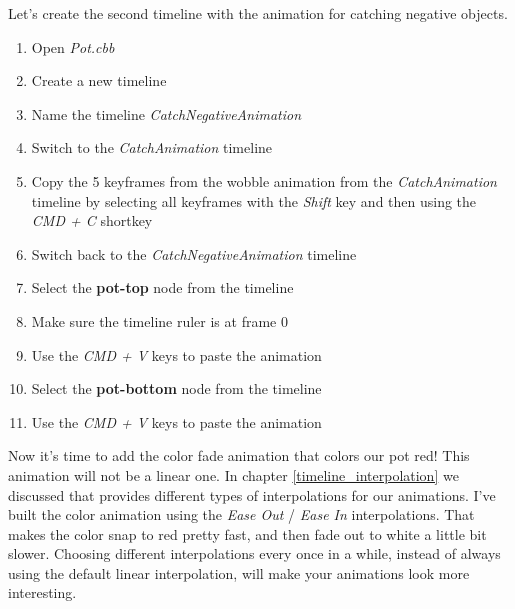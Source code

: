 \begin{leftbar}
Let's create the second timeline with the animation for catching negative
objects.
\begin{enumerate}
  \item Open \textit{Pot.cbb}
  \item Create a new timeline
  \item Name the timeline \textit{CatchNegativeAnimation}
  \item Switch to the \textit{CatchAnimation} timeline
  \item Copy the 5 keyframes from the wobble animation from the
  \textit{CatchAnimation} timeline by selecting all keyframes with the
  \textit{Shift} key and then using the \textit{CMD + C} shortkey
  \item Switch back to the \textit{CatchNegativeAnimation} timeline
  \item Select the \textbf{pot-top} node from the timeline
  \item Make sure the timeline ruler is at frame 0
  \item Use the \textit{CMD + V} keys to paste the animation
  \item Select the \textbf{pot-bottom} node from the timeline
  \item Use the \textit{CMD + V} keys to paste the animation
\end{enumerate}
\end{leftbar}

Now it's time to add the color fade animation that colors our pot red! This
animation will not be a linear one. In chapter \ref{timeline_interpolation} we discussed that \cocos{}
provides different types of interpolations for our animations. I've built the
color animation using the \textit{Ease Out} / \textit{Ease In} interpolations.
That makes the color snap to red pretty fast, and then fade out to white a
little bit slower. Choosing different interpolations every once in a while,
instead of always using the default linear interpolation, will make your
animations look more interesting.

